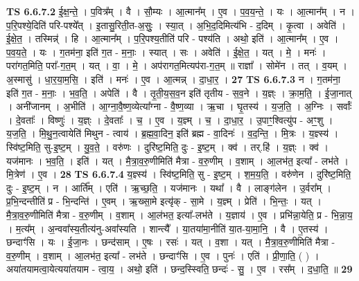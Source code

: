 \documentclass[17pt]{extarticle}
\begin{document}
                  \newline
                                \textbf{ TS 6.6.7.2} \newline
                  ई॒क्ष॒न्ते॒ । प॒वित्र᳚म् । वै । सौ॒म्यः । आ॒त्मान᳚म् । ए॒व । प॒व॒य॒न्ते॒ । यः । आ॒त्मान᳚म् । न । प॒रि॒पश्ये॒दिति॑ परि-पश्ये᳚त् । इ॒तासु॒रिती॒त-अ॒सुः॒ । स्या॒त् । अ॒भि॒द॒दिमित्य॑भि - द॒दिम् । कृ॒त्वा । अवेति॑ । ई॒क्षे॒त॒ । तस्मिन्न्॑ । हि । आ॒त्मान᳚म् । प॒रि॒पश्य॒तीति॑ परि - पश्य॑ति । अथो॒ इति॑ । आ॒त्मान᳚म् । ए॒व । प॒व॒य॒ते॒ । यः । ग॒तम॑ना॒ इति॑ ग॒त - म॒नाः॒ । स्यात् । सः । अवेति॑ । ई॒क्षे॒त॒ । यत् । मे॒ । मनः॑ । परा॑गत॒मिति॒ परा᳚-ग॒त॒म् । यत् । वा॒ । मे॒ । अप॑रागत॒मित्यप॑रा-ग॒त॒म् ॥ राज्ञा᳚ । सोमे॑न । तत् । व॒यम् । अ॒स्मासु॑ । धा॒र॒या॒म॒सि॒ । इति॑ । मनः॑ । ए॒व । आ॒त्मन्न् । दा॒धा॒र॒ । \textbf{  27} \newline
                  \newline
                                \textbf{ TS 6.6.7.3} \newline
                  न । ग॒तम॑ना॒ इति॑ ग॒त - म॒नाः॒ । भ॒व॒ति॒ । अपेति॑ । वै । तृ॒ती॒य॒स॒व॒न इति॑ तृतीय - स॒व॒ने । य॒ज्ञ्ः । क्रा॒म॒ति॒ । ई॒जा॒नात् । अनी॑जानम् । अ॒भीति॑ । आ॒ग्ना॒वै॒ष्ण॒व्येत्या᳚ग्ना - वै॒ष्ण॒व्या । ऋ॒चा । घृ॒तस्य॑ । य॒ज॒ति॒ । अ॒ग्निः । सर्वाः᳚ । दे॒वताः᳚ । विष्णुः॑ । य॒ज्ञ्ः । दे॒वताः᳚ । च॒ । ए॒व । य॒ज्ञ्म् । च॒ । दा॒धा॒र॒ । उ॒पाꣳ॒॒श्वित्यु॑प - अꣳ॒॒शु । य॒ज॒ति॒ । मि॒थु॒न॒त्वायेति॑ मिथुन - त्वाय॑ । ब्र॒ह्म॒वा॒दिन॒ इति॑ ब्रह्म - वा॒दिनः॑ । व॒द॒न्ति॒ । मि॒त्रः । य॒ज्ञ्स्य॑ । स्वि॑ष्ट॒मिति॒ सु-इ॒ष्ट॒म् । यु॒व॒ते॒ । वरु॑णः । दुरि॑ष्ट॒मिति॒ दुः - इ॒ष्ट॒म् । क्व॑ । तर्.हि॑ । य॒ज्ञ्ः । क्व॑ । यज॑मानः । भ॒व॒ति॒ । इति॑ । यत् । मै॒त्रा॒व॒रु॒णीमिति॑ मैत्रा - व॒रु॒णीम् । व॒शाम् । आ॒लभ॑त॒ इत्या᳚ - लभ॑ते । मि॒त्रेण॑ । ए॒व । \textbf{  28} \newline
                  \newline
                                \textbf{ TS 6.6.7.4} \newline
                  य॒ज्ञ्स्य॑ । स्वि॑ष्ट॒मिति॒ सु - इ॒ष्ट॒म् । श॒म॒य॒ति॒ । वरु॑णेन । दुरि॑ष्ट॒मिति॒ दुः - इ॒ष्ट॒म् । न । आर्ति᳚म् । एति॑ । ऋ॒च्छ॒ति॒ । यज॑मानः । यथा᳚ । वै । लाङ्ग॑लेन । उ॒र्वरा᳚म् । प्र॒भि॒न्दन्तीति॑ प्र - भि॒न्दन्ति॑ । ए॒वम् । ऋ॒ख्सा॒मे इत्यृ॑क् - सा॒मे । य॒ज्ञ्म् । प्रेति॑ । भि॒न्तः॒ । यत् । मै॒त्रा॒व॒रु॒णीमिति॑ मैत्रा - व॒रु॒णीम् । व॒शाम् । आ॒ल॑भत॒ इत्या᳚-लभ॑ते । य॒ज्ञाय॑ । ए॒व । प्रभि॑न्ना॒येति॒ प्र - भि॒न्ना॒य॒ । म॒त्य᳚म् । अ॒न्ववा᳚स्य॒तीत्य॑नु-अवा᳚स्यति । शान्त्यै᳚ । या॒तया॑मा॒नीति॑ या॒त-या॒मा॒नि॒ । वै । ए॒तस्य॑ । छन्दाꣳ॑सि । यः । ई॒जा॒नः । छन्द॑साम् । ए॒षः । रसः॑ । यत् । व॒शा । यत् । मै॒त्रा॒व॒रु॒णीमिति॑ मैत्रा - व॒रु॒णीम् । व॒शाम् । आ॒लभ॑त॒ इत्या᳚ - लभ॑ते । छन्दाꣳ॑सि । ए॒व । पुनः॑ । एति॑ । प्री॒णा॒ति॒ ( ) । अया॑तयामत्वा॒येत्यया॑तयाम - त्वा॒य॒ । अथो॒ इति॑ । छन्द॒स्स्विति॒ छन्दः॑ - सु॒ । ए॒व । रस᳚म् । द॒धा॒ति॒ ॥ \textbf{  29} \newline
\end{document}

